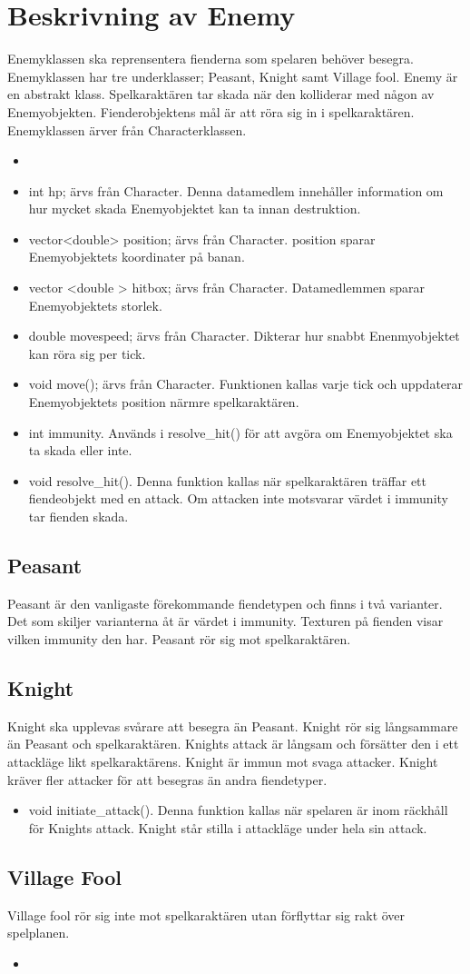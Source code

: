 \documentclass{TDP005mall}
\begin{document}
\section{Beskrivning av Enemy}
Enemyklassen ska reprensentera fienderna som spelaren behöver besegra. Enemyklassen har tre underklasser; Peasant, Knight samt Village fool. Enemy är en abstrakt klass. Spelkaraktären tar skada när den kolliderar med någon av Enemyobjekten. Fienderobjektens mål är att röra sig in i spelkaraktären. Enemyklassen ärver från Characterklassen.
\begin{itemize}
\item
\item int hp; ärvs från Character. Denna datamedlem innehåller information om hur mycket skada Enemyobjektet kan ta innan destruktion.
\item vector<double> position; ärvs från Character. position sparar Enemyobjektets koordinater på banan.
\item vector <double > hitbox; ärvs från Character. Datamedlemmen sparar Enemyobjektets storlek.
\item double movespeed; ärvs från Character. Dikterar hur snabbt Enenmyobjektet kan röra sig per tick.
\item void move(); ärvs från Character. Funktionen kallas varje tick och uppdaterar Enemyobjektets position närmre spelkaraktären.
\item int immunity. Används i resolve\_hit() för att avgöra om Enemyobjektet ska ta skada eller inte.
\item void resolve\_hit(). Denna funktion kallas när spelkaraktären träffar ett fiendeobjekt med en attack. Om attacken inte motsvarar värdet i immunity tar fienden skada.
\end{itemize}
\subsection{Peasant}
Peasant är den vanligaste förekommande fiendetypen och finns i två varianter. Det som skiljer varianterna åt är värdet i immunity. Texturen på fienden visar vilken immunity den har.
Peasant rör sig mot spelkaraktären. 
\subsection{Knight}
Knight ska upplevas svårare att besegra än Peasant. Knight rör sig långsammare än Peasant och spelkaraktären. Knights attack är långsam och försätter den i ett attackläge likt spelkaraktärens. Knight är immun mot svaga attacker. Knight kräver fler attacker för att besegras än andra fiendetyper.
\begin{itemize}
\item void initiate\_attack(). Denna funktion kallas när spelaren är inom räckhåll för Knights attack. Knight står stilla i attackläge under hela sin attack.
\end{itemize}
\subsection{Village Fool}
Village fool rör sig inte mot spelkaraktären utan förflyttar sig rakt över spelplanen. 
\begin{itemize}
\item 
\end{itemize}
\end{document}
